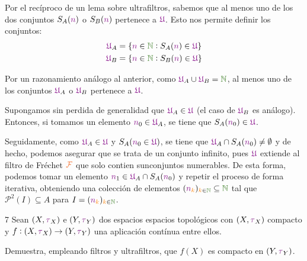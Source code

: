 \documentclass[titlepage,11pt,a4paper]{book}
\newcommand{\NN}{\ensuremath{\textcolor{OliveGreen}{\mathbb{N}}}}
\newcommand{\filt}{\ensuremath{\textcolor{Orange}{\mathcal{F}}}}
\newcommand{\ultf}{\ensuremath{\textcolor{Plum}{\mathfrak{U}}}}
\newcommand{\nn}{\ensuremath{\textcolor{Plum}{n}}}
\newcommand{\taut}{\textcolor{Fuchsia}{\tau}}
\newcommand{\kk}{\textcolor{orange}{k}}
\begin{document}
\begin{resol}
        \smallskip
        Por el recíproco de un lema sobre ultrafiltros, sabemos que al menos uno de los dos conjuntos $S_{A}(\nn)$ o $S_{B}(\nn)$ pertenece a $\ultf$. Esto nos permite definir los conjuntos:
        \[
        \begin{aligned}
            \ultf_{A} &= \{\nn \in \NN : S_{A}(\nn) \in \ultf\}\\
            \ultf_{B} &= \{\nn \in \NN : S_{B}(\nn) \in \ultf\}
        \end{aligned}
        \]

        \medskip
        Por un razonamiento análogo al anterior, como $\ultf_{A} \cup \ultf_{B} = \NN$, al menos uno de los conjuntos $\ultf_{A}$ o $\ultf_{B}$ pertenece a $\ultf$.
        
        \medskip
        Supongamos sin perdida de generalidad que $\ultf_{A} \in \ultf$ (el caso de $\ultf_{B}$ es análogo). Entonces, si tomamos un elemento $\nn_{0} \in \ultf_{A}$, se tiene que $S_{A}(\nn_{0}) \in \ultf$.

        \smallskip
        Seguidamente, como $\ultf_{A} \in \ultf$ y $S_{A}(\nn_{0} \in \ultf)$, se tiene que $\ultf_{A} \cap S_{A}(\nn_0) \neq \emptyset$ y de hecho, podemos asegurar que se trata de un conjunto infinito, pues $\ultf$ extiende al filtro de Fréchet $\filt$ que solo contien sunconjuntos numerables.
        De esta forma, podemos tomar un elemento $\nn_{1} \in \ultf_{A} \cap S_{A}(\nn_0)$ y repetir el proceso de forma iterativa, obteniendo una colección de elementos $(\nn_{\kk})_{\kk \in \NN} \subseteq \NN$ tal que $\mathcal{P}^{2}(I) \subseteq A$ para $I = (\nn_{\kk})_{\kk \in \NN}$.
    \end{resol}


    \begin{ejer*}{7}
        Sean $(X, \taut_{X})$ e $(Y,\taut_{Y})$ dos espacios espacios topológicos con $(X, \taut_{X})$ compacto y $f : (X,\taut_{X}) \to (Y,\taut_{Y})$ una aplicación contínua entre ellos.

        \smallskip
        Demuestra, empleando filtros y ultrafiltros, que $f(X)$ es compacto en $(Y,\taut_{Y})$.

    \end{ejer*}
\end{document}
